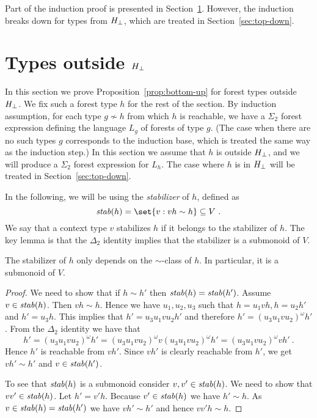 \documentclass{LMCS}
\begin{document}
Part of the  induction proof is presented in Section~\ref{sec:induction-step}.
However, the induction breaks down for types from ${H_\bot}$, which are
treated in Section~\ref{sec:top-down}.



\section{Types  outside \texorpdfstring{${H_\bot}$}{Hbot}}\label{sec:induction-step}


In this section we prove Proposition~\ref{prop:bottom-up} for forest types outside ${H_\bot}$. We fix such a forest type $h$ for the rest of the section. By induction assumption, for each type $g \not \sim h$ from
which $h$ is reachable, we have a $\Sigma_2$ forest expression defining the
language $L_g$ of forests of type $g$. (The case when there are no
such types $g$ corresponds to the induction base, which is treated the
same way as the induction step.) In this section we assume that $h$ is
outside ${H_\bot}$, and we will produce a $\Sigma_2$ forest expression
for $L_h$. The case where $h$ is in ${H_\bot}$ will be treated in
Section~\ref{sec:top-down}.

In the following, we will be using the \emph{stabilizer} of $h$,
defined as
\[
  \stab(h)  =  \set{v : vh \sim h} \subseteq V \ .
\]
We say that a context type $v$ stabilizes $h$ if it belongs to the
stabilizer of $h$.  The key lemma is that the $\Delta_2$ identity
implies that the stabilizer is a submonoid of $V$.

\begin{lem}\label{lemma:closed-under-comp}
  The stabilizer of $h$ only depends on the $\sim$-class of $h$. In
  particular, it is a  submonoid of $V$.
\end{lem}
\begin{proof}
  We need to show that if $h \sim h'$ then
  $\mathit{stab}(h)=\mathit{stab}(h')$. Assume $v \in \mathit{stab}(h)$. Then $vh \sim
  h$. Hence we have $u_1,u_2,u_3$ such that $h=u_1vh, h=u_2h'$ and
  $h'=u_3h$. This implies that $h'=u_3u_1vu_2 h'$ and therefore
  $h'=(u_3u_1vu_2)^\omega h'$. From the $\Delta_2$ identity we have that
  \[
h'=(u_3u_1vu_2)^\omega h'= (u_3u_1vu_2)^\omega v (u_3u_1vu_2)^\omega h' = (u_3u_1vu_2)^\omega v h'\ .
\]
  Hence $h'$ is reachable from $vh'$. Since $vh'$ is clearly reachable
from $h'$, we get $vh' \sim h'$  and $v \in \mathit{stab}(h')$.

To see that $\mathit{stab}(h)$ is a submonoid consider $v,v' \in \mathit{stab}(h)$. We need to
show that $vv' \in \mathit{stab}(h)$. Let $h'=v'h$. Because $v' \in \mathit{stab}(h)$ we have $h'
\sim h$. As $v \in \mathit{stab}(h)=\mathit{stab}(h')$ we have $vh'\sim h'$ and hence $vv'h
\sim h$.
\end{proof}
\end{document}
